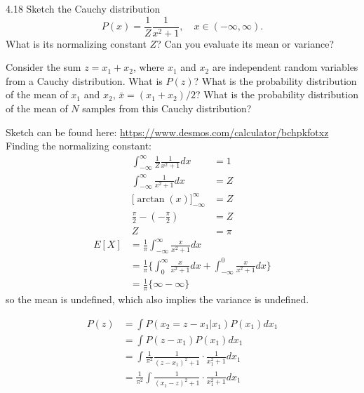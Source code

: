 \documentclass[12pt, a4paper]{article}
\begin{document}
\begin{prob}{4.18}
    Sketch the Cauchy distribution
\begin{equation}\tag{4.40}
P(x) = \frac{1}{Z} \frac{1}{x^2 + 1}, \quad x \in (-\infty, \infty).
\end{equation}
What is its normalizing constant $Z$? Can you evaluate its mean or variance?

\vspace{0.5em}
\noindent Consider the sum $z = x_1 + x_2$, where $x_1$ and $x_2$ are independent random variables from a Cauchy distribution. What is $P(z)$? What is the probability distribution of the mean of $x_1$ and $x_2$, $\bar{x} = (x_1 + x_2)/2$? What is the probability distribution of the mean of $N$ samples from this Cauchy distribution?
\end{prob}
\begin{sol}
    Sketch can be found here: \href{https://www.desmos.com/calculator/bchpkfotxz}{https://www.desmos.com/calculator/bchpkfotxz} \\

    Finding the normalizing constant:
\begin{align*}
    \int_{-\infty}^{\infty} \frac{1}{Z} \frac{1}{x^2 + 1} dx &= 1 \\
    \int_{-\infty}^{\infty} \frac{1}{x^2 + 1} dx &= Z \\
    \big[ \arctan(x) \big]_{-\infty}^{\infty} &= Z \\
    \frac{\pi}{2} - (- \frac{\pi}{2}) &= Z \\
    Z &= \pi 
\end{align*}
\begin{align*}
    E[X] &= \frac{1}{\pi} \int_{-\infty}^{\infty} \frac{x}{x^2 + 1} dx \\
    &= \frac{1}{\pi} \{ \int_{0}^{\infty} \frac{x}{x^2 + 1} dx + \int_{-\infty}^{0} \frac{x}{x^2 + 1} dx \} \\
    &= \frac{1}{\pi} \{ \infty - \infty \}
\end{align*}
so the mean is undefined, which also implies the variance is undefined.

\begin{align*}
    P(z) &= \int P(x_2 = z - x_1 | x_1)P(x_1) dx_1 \\
    &= \int P(z - x_1)P(x_1) dx_1 \\
    &= \int \frac{1}{\pi^2} \frac{1}{(z-x_1)^2 + 1} \cdot \frac{1}{x_1^2 + 1} dx_1 \\
    &= \frac{1}{\pi^2} \int \frac{1}{(x_1-z)^2 + 1} \cdot \frac{1}{x_1^2 + 1} dx_1
\end{align*}
\end{sol}
\bigskip
\end{document}
